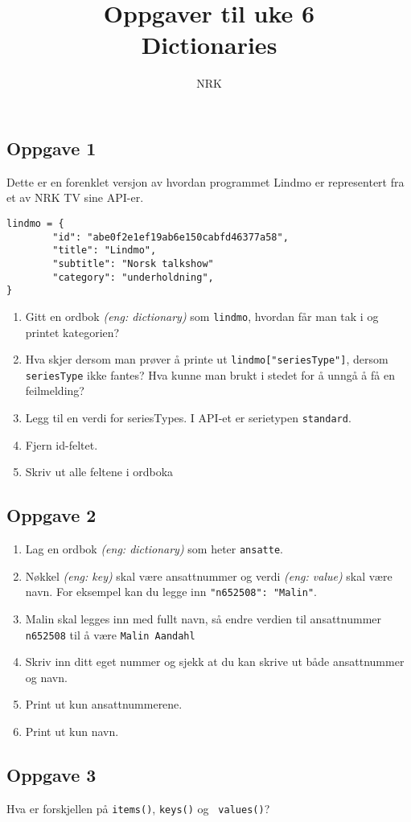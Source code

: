 \documentclass{article}
\title{Oppgaver til uke 6 \\ Dictionaries}
\author{NRK}
\date{}
\begin{document}
\maketitle
\noindent

\subsection*{Oppgave 1}
Dette er en forenklet versjon av hvordan programmet Lindmo er representert fra et av NRK TV sine API-er.
\begin{verbatim}
lindmo = {
	    "id": "abe0f2e1ef19ab6e150cabfd46377a58",
	    "title": "Lindmo",
	    "subtitle": "Norsk talkshow"
	    "category": "underholdning",
}
\end{verbatim}

\begin{enumerate}
\item Gitt en ordbok \textit{(eng: dictionary)} som \texttt{lindmo}, hvordan får man tak i og printet kategorien?
\item Hva skjer dersom man prøver å printe ut \texttt{lindmo["seriesType"]}, dersom \texttt{seriesType} ikke fantes? Hva kunne man brukt i stedet for å unngå å få en feilmelding?
\item Legg til en verdi for seriesTypes. I API-et er serietypen \texttt{standard}.
\item Fjern id-feltet.
\item Skriv ut alle feltene i ordboka
\end{enumerate}

\subsection*{Oppgave 2}

\begin{enumerate}
\item Lag en ordbok \textit{(eng: dictionary)} som heter \texttt{ansatte}.
\item Nøkkel \textit{(eng: key)} skal være ansattnummer og verdi \textit{(eng: value)} skal være navn. For eksempel kan du legge inn \texttt{"n652508": "Malin"}.
\item Malin skal legges inn med fullt navn, så endre verdien til ansattnummer \texttt{n652508} til å være \texttt{Malin Aandahl}
\item Skriv inn ditt eget nummer og sjekk at du kan skrive ut både ansattnummer og navn.
\item Print ut kun ansattnummerene.
\item Print ut kun navn.
\end{enumerate}


\subsection*{Oppgave 3}

Hva er forskjellen på \texttt{items()},  \texttt{keys()} og  \texttt{ values()}?
\end{document}
